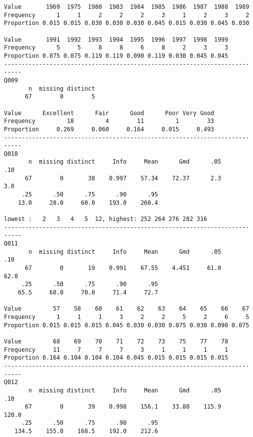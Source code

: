 \documentclass[]{article}
\begin{document}
\begin{verbatim}
Value       1969  1975  1980  1983  1984  1985  1986  1987  1988  1989
Frequency      1     1     2     2     2     3     1     2     3     2
Proportion 0.015 0.015 0.030 0.030 0.030 0.045 0.015 0.030 0.045 0.030
                                                                
Value       1991  1992  1993  1994  1995  1996  1997  1998  1999
Frequency      5     5     8     8     6     8     2     3     3
Proportion 0.075 0.075 0.119 0.119 0.090 0.119 0.030 0.045 0.045
---------------------------------------------------------------------------
Q009 
       n  missing distinct 
      67        0        5 
                                                            
Value      Excellent      Fair      Good      Poor Very Good
Frequency         18         4        11         1        33
Proportion     0.269     0.060     0.164     0.015     0.493
---------------------------------------------------------------------------
Q010 
       n  missing distinct     Info     Mean      Gmd      .05      .10 
      67        0       38    0.997    57.34    72.37      2.3      3.0 
     .25      .50      .75      .90      .95 
    13.0     28.0     60.0    193.0    260.4 

lowest :   2   3   4   5  12, highest: 252 264 276 282 316
---------------------------------------------------------------------------
Q011 
       n  missing distinct     Info     Mean      Gmd      .05      .10 
      67        0       19    0.991    67.55    4.451     61.0     62.0 
     .25      .50      .75      .90      .95 
    65.5     68.0     70.0     71.4     72.7 
                                                                      
Value         57    58    60    61    62    63    64    65    66    67
Frequency      1     1     1     3     2     2     5     2     6     5
Proportion 0.015 0.015 0.015 0.045 0.030 0.030 0.075 0.030 0.090 0.075
                                                                
Value         68    69    70    71    72    73    75    77    78
Frequency     11     7     7     7     3     1     1     1     1
Proportion 0.164 0.104 0.104 0.104 0.045 0.015 0.015 0.015 0.015
---------------------------------------------------------------------------
Q012 
       n  missing distinct     Info     Mean      Gmd      .05      .10 
      67        0       39    0.998    156.1    33.88    115.9    120.0 
     .25      .50      .75      .90      .95 
   134.5    155.0    168.5    192.0    212.6 


\end{verbatim}
\end{document}
